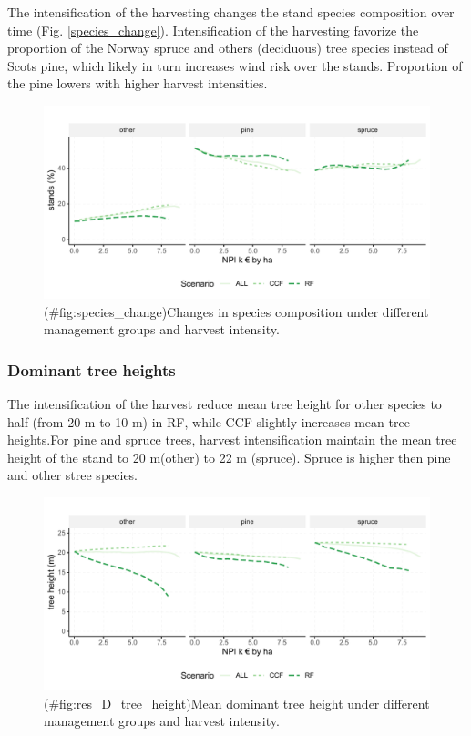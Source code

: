 \documentclass[]{elsarticle} %
\makeatletter
\def\maxwidth{\ifdim\Gin@nat@width>\linewidth\linewidth
\else\Gin@nat@width\fi}
\let\Oldincludegraphics\includegraphics
\renewcommand{\includegraphics}[1]{\Oldincludegraphics[width=\maxwidth]{#1}}
\makeatother
\begin{document}
The intensification of the harvesting changes the stand species
composition over time (Fig. \ref{species_change}). Intensification of
the harvesting favorize the proportion of the Norway spruce and others
(deciduous) tree species instead of Scots pine, which likely in turn
increases wind risk over the stands. Proportion of the pine lowers with
higher harvest intensities.

\begin{figure}
\centering
\includegraphics{test_manus_files/figure-latex/species_change-1.pdf}
\caption{(\#fig:species\_change)Changes in species composition under
different management groups and harvest intensity.}
\end{figure}

\subsubsection{Dominant tree heights}\label{dominant-tree-heights}

The intensification of the harvest reduce mean tree height for other
species to half (from 20 m to 10 m) in RF, while CCF slightly increases
mean tree heights.For pine and spruce trees, harvest intensification
maintain the mean tree height of the stand to 20 m(other) to 22 m
(spruce). Spruce is higher then pine and other stree species.

\begin{figure}
\centering
\includegraphics{test_manus_files/figure-latex/res_D_tree_height-1.pdf}
\caption{(\#fig:res\_D\_tree\_height)Mean dominant tree height under
different management groups and harvest intensity.}
\end{figure}
\end{document}
